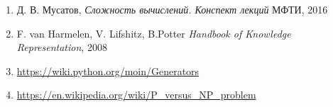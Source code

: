\documentclass[paper=a4, fontsize=11pt]{scrartcl}
\begin{document}
\begin{enumerate}
\item Д. В. Мусатов, \textit{Сложность вычислений. Конспект лекций}
МФТИ, 2016

\item F. van Harmelen, V. Lifshitz, B.Potter
    \textit{Handbook of Knowledge Representation}, 2008

\item \url{https://wiki.python.org/moin/Generators}

\item \url{https://en.wikipedia.org/wiki/P\_versus\_NP\_problem}

\end{enumerate}
\end{document}
